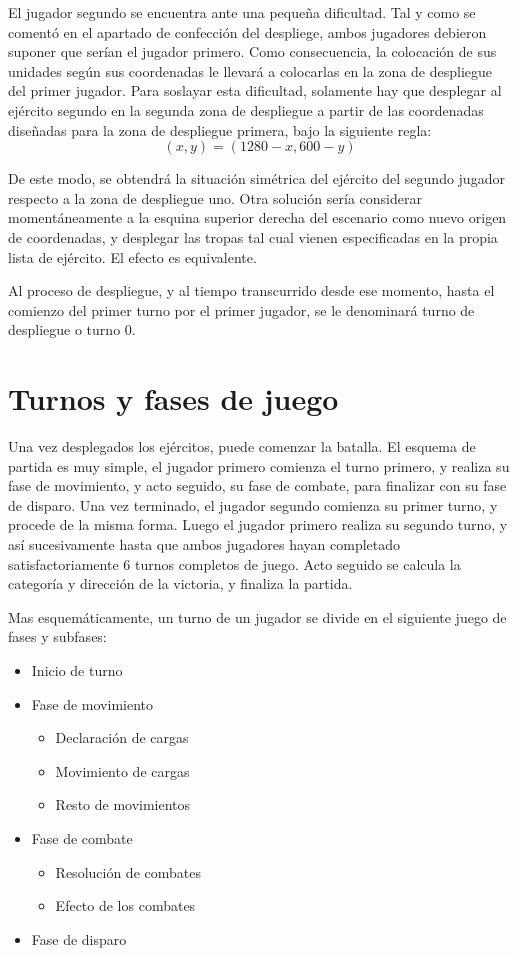 El jugador segundo se encuentra ante una pequeña dificultad. Tal y
como se comentó en el apartado de confección del despliege, ambos
jugadores debieron suponer que serían el jugador primero. Como
consecuencia, la colocación de sus unidades según sus coordenadas le
llevará a colocarlas en la zona de despliegue del primer jugador. Para
soslayar esta dificultad, solamente hay que desplegar al ejército
segundo en la segunda zona de despliegue a partir de las coordenadas
diseñadas para la zona de despliegue primera, bajo la siguiente
regla: \[(x,y)=(1280 - x, 600 - y)\]

De este modo, se obtendrá la situación simétrica del ejército del
segundo jugador respecto a la zona de despliegue uno. Otra solución
sería considerar momentáneamente a la esquina superior derecha del
escenario como nuevo origen de coordenadas, y desplegar las tropas tal
cual vienen especificadas en la propia lista de ejército. El efecto es
equivalente.

Al proceso de despliegue, y al tiempo transcurrido desde ese momento,
hasta el comienzo del primer turno por el primer jugador, se le
denominará turno de despliegue o turno 0.

\section*{Turnos y fases de juego}
\label{turnos}
Una vez desplegados los ejércitos, puede comenzar la batalla. El
esquema de partida es muy simple, el jugador primero comienza el turno
primero, y realiza su fase de movimiento, y acto seguido, su fase de
combate, para finalizar con su fase de disparo. Una vez terminado, el
jugador segundo comienza su primer turno, y procede de la misma
forma. Luego el jugador primero realiza su segundo turno, y así
sucesivamente hasta que ambos jugadores hayan completado
satisfactoriamente 6 turnos completos de juego. Acto seguido se
calcula la categoría y dirección de la victoria, y finaliza la
partida.

Mas esquemáticamente, un turno de un jugador se divide en el siguiente
juego de fases y subfases:
\begin{itemize}
\item Inicio de turno
\item Fase de movimiento
\begin{itemize}
\item Declaración de cargas
\item Movimiento de cargas
\item Resto de movimientos
\end{itemize}
\item Fase de combate
\begin{itemize}
\item Resolución de combates
\item Efecto de los combates
\end{itemize}
\item Fase de disparo
\end{itemize}

